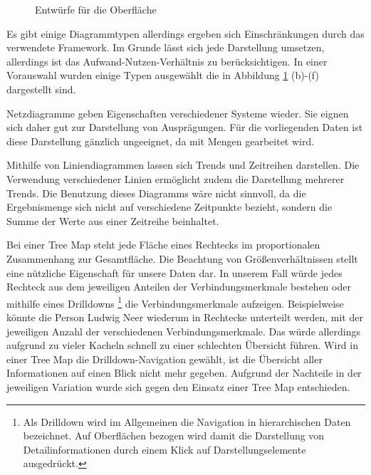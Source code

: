 \begin{figure}[htbp]
\caption{Entwürfe für die Oberfläche}
\label{konzept_darstellung}
\end{figure}

Es gibt einige Diagrammtypen allerdings ergeben sich Einschränkungen durch das verwendete Framework. Im Grunde lässt sich jede Darstellung umsetzen, allerdings ist das Aufwand-Nutzen-Verhältnis zu berücksichtigen. In einer Vorauswahl wurden einige  Typen ausgewählt die in Abbildung \ref{konzept_darstellung} (b)-(f) dargestellt sind. 

Netzdiagramme geben Eigenschaften verschiedener Systeme wieder. Sie eignen sich daher gut zur Darstellung von Ausprägungen. Für die vorliegenden Daten ist diese Darstellung gänzlich ungeeignet, da mit Mengen gearbeitet wird. 

Mithilfe von Liniendiagrammen lassen sich Trends und Zeitreihen darstellen. Die Verwendung verschiedener Linien ermöglicht zudem die Darstellung mehrerer Trends. Die Benutzung dieses Diagramms wäre nicht sinnvoll, da die Ergebnismenge sich nicht auf verschiedene Zeitpunkte bezieht, sondern die Summe der Werte aus einer Zeitreihe beinhaltet. 

Bei einer Tree Map steht jede Fläche eines Rechtecks im proportionalen Zusammenhang zur Gesamtfläche. Die Beachtung von Größenverhältnissen stellt eine nützliche Eigenschaft für unsere Daten dar. In unserem Fall würde jedes Rechteck aus dem jeweiligen Anteilen der Verbindungsmerkmale bestehen oder mithilfe eines Drilldowns
\footnote{Als Drilldown wird im Allgemeinen die Navigation in hierarchischen Daten bezeichnet. Auf Oberflächen bezogen wird damit die Darstellung von Detailinformationen durch einem Klick auf Darstellungselemente ausgedrückt.}
 die Verbindungsmerkmale aufzeigen. Beispielweise könnte die Person Ludwig Neer wiederum in Rechtecke unterteilt werden, mit der jeweiligen Anzahl der verschiedenen Verbindungsmerkmale. Das würde allerdings aufgrund zu vieler Kacheln schnell zu einer schlechten Übersicht führen. Wird in einer Tree Map die Drilldown-Navigation gewählt, ist die Übersicht aller Informationen auf einen Blick nicht mehr gegeben. Aufgrund der Nachteile in der jeweiligen Variation wurde sich gegen den Einsatz einer Tree Map entschieden.

